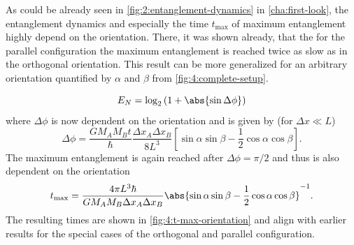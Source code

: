 As could be already seen in \cref{fig:2:entanglement-dynamics} in \cref{cha:first-look}, the entanglement dynamics and especially the time $t_\mathrm{max}$ of maximum entanglement highly depend on the orientation.
There, it was shown already, that the for the parallel configuration the maximum entanglement is reached twice as slow as in the orthogonal orientation.
This result can be more generalized for an arbitrary orientation quantified by $\alpha$ and $\beta$ from \cref{fig:4:complete-setup}.


\begin{equation}
  E_N = \log_2\left(1 + \abs{\sin\Delta \phi}\right)
\end{equation}
where $\Delta \phi$ is now dependent on the orientation and is given by (for $\Delta x \ll L$)
\begin{equation}
  \Delta \phi = \frac{G M_A M_B t}{\hbar}\frac{\Delta x_A \Delta x_B}{8 L^3} \left[\sin\alpha\sin\beta - \frac{1}{2}\cos\alpha\cos\beta\right] .
\end{equation}
The maximum entanglement is again reached after $\Delta\phi = \pi/2$ and thus is also dependent on the orientation
\begin{equation}\label{eq:4:t-max}
  t_\mathrm{max} = \frac{4\pi L^3\hbar}{GM_AM_B\Delta x_A \Delta x_B} \abs{\sin\alpha\sin\beta - \frac{1}{2}\cos\alpha\cos\beta}^{-1}.
\end{equation}
The resulting times are shown in \cref{fig:4:t-max-orientation} and align with earlier results for the special cases of the orthogonal and parallel configuration.

